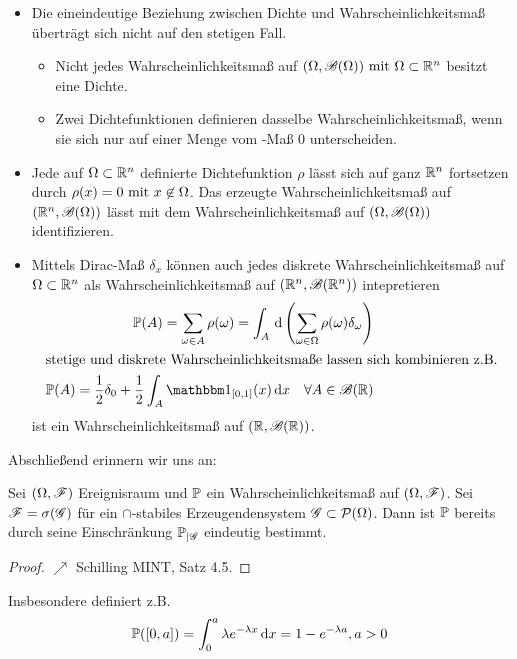 \begin{*remark}
	\begin{itemize}
		\item Die eineindeutige Beziehung zwischen Dichte und Wahrscheinlichkeitsmaß überträgt sich nicht auf den stetigen Fall.
		\begin{itemize}
			\item Nicht jedes Wahrscheinlichkeitsmaß auf $(\Omega, \borel(\Omega))  \mit \Omega \subset \Rn$ besitzt eine Dichte.
			\item Zwei Dichtefunktionen definieren dasselbe Wahrscheinlichkeitsmaß, wenn sie sich nur auf einer Menge vom -Maß 0 unterscheiden.
		\end{itemize}
		\item Jede auf $\Omega \subset \Rn$ definierte Dichtefunktion $\rho$ lässt sich auf ganz $\Rn$ fortsetzen durch $\rho(x) = 0\mit x \not\in \Omega$. Das erzeugte Wahrscheinlichkeitsmaß auf $(\Rn, \borel(\Omega))$ lässt mit dem Wahrscheinlichkeitsmaß auf $(\Omega, \borel(\Omega))$ identifizieren.
		\item Mittels Dirac-Maß $\delta_x$ können auch jedes diskrete Wahrscheinlichkeitsmaß auf $\Omega \subset \Rn$ als Wahrscheinlichkeitsmaß auf $(\Rn, \borel(\Rn))$ intepretieren
		\begin{align*}
			\P(A) = \sum_{\omega \in A} \rho(\omega) = \int_A \d \left( \sum_{\omega \in \Omega} \rho(\omega)\delta_{\omega} \right)\\
			\intertext{stetige und diskrete Wahrscheinlichkeitsmaße lassen sich kombinieren z.B.}
			\P(A) = \frac{1}{2} \delta_0 + \frac{1}{2} \int_A\indi_{[0,1]}(x)\d x \quad \forall A \in \borel(\R)
		\end{align*}
		ist ein Wahrscheinlichkeitsmaß auf $(\R, \borel(\R))$.
	\end{itemize}
\end{*remark}
Abschließend erinnern wir uns an:
\begin{proposition}
	Sei $(\Omega, \F)$ Ereignisraum und $\P$ ein Wahrscheinlichkeitsmaß auf $(\Omega, \F)$. 
	Sei $\F = \sigma(\G)$ für ein $\cap$-stabiles Erzeugendensystem $\G \subset \pows(\Omega)$. 
	Dann ist $\P$ bereits durch seine Einschränkung $\P_{\mid \G}$ eindeutig bestimmt.
\end{proposition}
\begin{proof}
	$\nearrow$ Schilling MINT, Satz 4.5.
\end{proof}
Insbesondere definiert z.B.
\begin{align}
	\probp([0,a]) = \int_{0}^{a} \lambda e^{-\lambda x}\diff x = 1 - e^{-\lambda a}, a > 0 \notag
\end{align}
